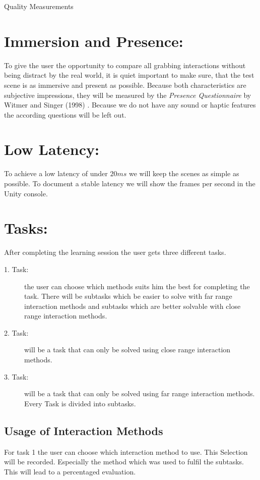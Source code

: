 \documentclass[a4paper, 12pt]{article}
\newcommand{\changefont}[3]{
\fontfamily{#1} \fontseries{#2} \fontshape{#3} \selectfont}
\begin{document}


\newpage

\LARGE{Quality Measurements}
\section {Immersion and Presence:} 
\small To give the user the opportunity to compare all grabbing interactions without being distract by the real world, it is quiet important to make sure, that the test scene is as immersive and present as possible. Because both characteristics are subjective impressions, they will be measured by the \textit{Presence Questionnaire} by Witmer and Singer (1998) \cite{witmer1998measuring}. Because we do not have any sound or haptic features the according questions will be left out. 

\section {Low Latency: }
To achieve a low latency of under $20 ms$ we will keep the scenes as simple as possible. To document a stable latency we will show the frames per second in the Unity console. 

\section {Tasks: }
After completing the learning session the user gets three different tasks. \\
\begin{description}
\item [1. Task:] the user can choose which methods suits him the best for completing the task. There will be subtasks which be easier to solve with far range interaction methods and subtasks which are better solvable with close range interaction methods. \\
\item [2. Task:] will be a task that can only be solved using close range interaction methods. \\
 \item [3. Task:] will be a task that can only be solved using far range interaction methods. \\
 Every Task is divided into subtasks. 
 \end{description}


\subsection{Usage of Interaction Methods}
For task 1 the user can choose which interaction method to use. This Selection will be recorded. Especially the method which was used to fulfil the subtasks. This will lead to a percentaged evaluation. 
\end{document}
